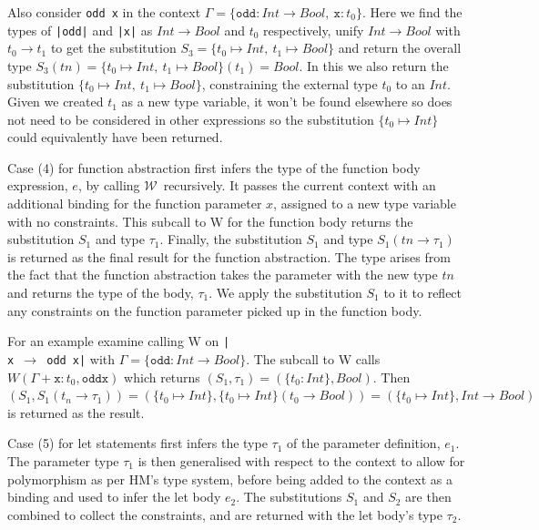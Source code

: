 \documentclass[a4paper,fleqn,oneside,12pt]{report}
\newcommand{\W}{$\mathcal{W}$}
\begin{document}
Also consider \texttt{odd x} in the context $\Gamma = \{ \mathtt{odd} : Int \rightarrow Bool,\ \mathtt{x} : t_0 \}$. Here we find the types of \texttt{|odd|} and \texttt{|x|} as $Int \rightarrow Bool$ and $t_0$ respectively, unify $Int \rightarrow Bool$ with $t_0 \rightarrow t_1$ to get the substitution $S_3 = \{ t_0 \mapsto Int,\ t_1 \mapsto Bool \}$ and return the overall type $S_3(tn) = \{ t_0 \mapsto Int,\ t_1 \mapsto Bool \}(t_1) = Bool$. In this we also return the substitution $\{ t_0 \mapsto Int,\ t_1 \mapsto Bool \}$, constraining the external type $t_0$ to an $Int$. Given we created $t_1$ as a new type variable, it won’t be found elsewhere so does not need to be considered in other expressions so the substitution $\{ t_0 \mapsto Int \}$ could equivalently have been returned.

Case (4) for function abstraction first infers the type of the function body expression, $e$, by calling \W\ recursively. It passes the current context with an additional binding for the function parameter $x$, assigned to a new type variable with no constraints. This subcall to W for the function body returns the substitution $S_1$ and type $\tau_1$. Finally, the substitution $S_1$ and type $S_1(tn \rightarrow \tau_1)$ is returned as the final result for the function abstraction. The type arises from the fact that the function abstraction takes the parameter with the new type $tn$ and returns the type of the body, $\tau_1$. We apply the substitution $S_1$ to it to reflect any constraints on the function parameter picked up in the function body.

For an example examine calling W on \texttt{|\\x $\rightarrow$ odd x|} with $\Gamma = \{ \mathtt{odd} : Int \rightarrow Bool \}$. The subcall to W calls $W(\Gamma + \mathtt{x} : t_0, \mathtt{odd x})$ which returns $(S_1, \tau_1) = (\{ t_0: Int \}, Bool)$. Then $(S_1, S_1(t_n \rightarrow \tau_1)) = (\{ t_0 \mapsto Int \}, \{ t_0 \mapsto Int \}(t_0 \rightarrow Bool)) = (\{ t_0 \mapsto Int \}, Int \rightarrow Bool)$ is returned as the result.

Case (5) for let statements first infers the type $\tau_1$ of the parameter definition, $e_1$. The parameter type $\tau_1$ is then generalised with respect to the context to allow for polymorphism as per HM’s type system, before being added to the context as a binding and used to infer the let body $e_2$. The substitutions $S_1$ and $S_2$ are then combined to collect the constraints, and are returned with the let body’s type $\tau_2$.
\end{document}
